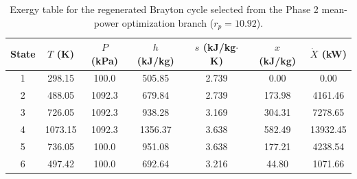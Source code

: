 \begin{table}[htbp]
    \centering
    \caption{Exergy table for the regenerated Brayton cycle selected from the Phase 2 mean-power optimization branch ($r_p = 10.92$).}
    \label{tab:phase5_exergy_phase2_optimization}
    \begin{tabular}{c c c c c c c}
        \hline
        State & $T$ (K) & $P$ (kPa) & $h$ (kJ/kg) & $s$ (kJ/kg$\cdot$K) & $x$ (kJ/kg) & $\dot{X}$ (kW) \\
        \hline
        1 & 298.15 & 100.0 & 505.85 & 2.739 & 0.00 & 0.00 \\
        2 & 488.05 & 1092.3 & 679.84 & 2.739 & 173.98 & 4161.46 \\
        3 & 726.05 & 1092.3 & 938.28 & 3.169 & 304.31 & 7278.65 \\
        4 & 1073.15 & 1092.3 & 1356.37 & 3.638 & 582.49 & 13932.45 \\
        5 & 736.05 & 100.0 & 951.08 & 3.638 & 177.21 & 4238.54 \\
        6 & 497.42 & 100.0 & 692.64 & 3.216 & 44.80 & 1071.66 \\
        \hline
    \end{tabular}
\end{table}
